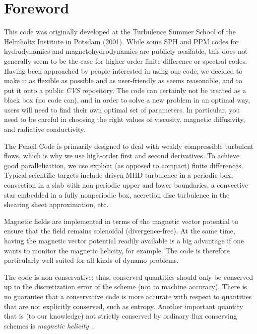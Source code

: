 \documentclass[\mydriver,12pt,twoside,notitlepage,a4paper]{article}
\makeatletter
\newcommand{\name}[2][]{%
  \def\index@{#1}%
  \textsl{#2\/}%
  \ifx\index@\@empty\index{#2@\MakeUppercase #2}%
  \else\index{#1}%
  \fi%
}
\makeatother
\begin{document}
\clearpage


\section*{Foreword}

This code was originally developed at the Turbulence Summer School of the
Helmholtz Institute in Potsdam (2001).
While some SPH and PPM codes for hydrodynamics and magnetohydrodynamics
are publicly available, this does not generally seem to be
the case for higher order finite-difference or spectral codes.
Having been approached by people interested in using our code, we
decided to make it as flexible as possible and as user-friendly as seems
reasonable, and to put it onto a public \name{CVS} repository.
The code can certainly not be treated as a black box (no code can), and in
order to solve a new problem in an optimal way, users will need to find their
own optimal set of parameters.
In particular, you need to be careful in choosing
the right values of viscosity, magnetic diffusivity, and radiative
conductivity.

The {\sc Pencil Code} is primarily designed to deal with weakly compressible
turbulent flows, which is why we use high-order first and second derivatives.
To achieve good parallelization, we use explicit
(as opposed to compact) finite differences.
Typical scientific targets include driven MHD turbulence in a periodic box,
convection in a slab with non-periodic upper and lower boundaries,
a convective star embedded in a fully nonperiodic box, accretion disc
turbulence in the shearing sheet approximation, etc.

Magnetic fields are implemented in terms of the magnetic vector potential
to ensure that the field remains solenoidal (divergence-free).
At the same time, having the magnetic
vector potential readily available is a big advantage if
one wants to monitor the magnetic helicity, for example.
The code is therefore particularly well suited for all kinds of
dynamo problems.

The code is non-conservative; thus, conserved quantities should only be
conserved up to the discretization error of the scheme (not to machine
accuracy).
There is no guarantee that a conservative code is more accurate with
respect to quantities that are not explicitly conserved, such as entropy.
Another important quantity that is (to our knowledge) not strictly
conserved by ordinary flux conserving schemes is \name{magnetic helicity}.
\end{document}
